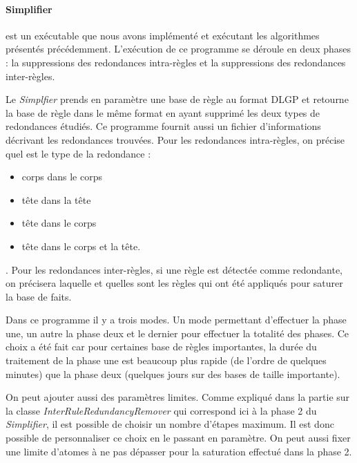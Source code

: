    \paragraph{Simplifier} est un exécutable que nous avons implémenté et exécutant les algorithmes présentés précédemment. 
    L'exécution de ce programme se déroule en deux phases : la suppressions des redondances intra-règles et la suppressions des redondances inter-règles. 
        \par Le \textit{Simplfier} prends en paramètre une base de règle au format DLGP et retourne la base de règle dans le même format en ayant supprimé les deux types de redondances étudiés. Ce programme fournit aussi un fichier d'informations décrivant les redondances trouvées. Pour les redondances intra-règles, on précise quel est le type de la redondance : 
        \begin{itemize}
            \item corps dans le corps
            \item tête dans la tête
            \item tête dans le corps
            \item tête dans le corps et la tête.
        \end{itemize}. 
        Pour les redondances inter-règles, si une règle est détectée comme redondante, on précisera laquelle et quelles sont les règles qui ont été appliqués pour saturer la base de faits. 
        \par Dans ce programme il y a trois modes. Un mode permettant d'effectuer la phase une, un autre la phase deux et le dernier pour effectuer la totalité des phases. Ce choix a été fait car pour certaines base de règles importantes, la durée du traitement de la phase une est beaucoup plus rapide (de l'ordre de quelques minutes) que la phase deux (quelques jours sur des bases de taille importante). 
        \par On peut ajouter aussi des paramètres limites. Comme expliqué dans la partie sur la classe \textit{InterRuleRedundancyRemover} qui correspond ici à la phase 2 du \textit{Simplifier}, il est possible de choisir un nombre d'étapes maximum. Il est donc possible de personnaliser ce choix en le passant en paramètre. On peut aussi fixer une limite d'atomes à ne pas dépasser pour la saturation effectué dans la phase 2. 
       
